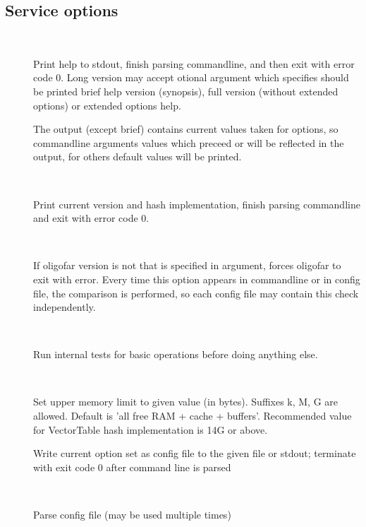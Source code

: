 \documentclass[english]{article}
\begin{document}
\subsection{Service options}
\begin{description}
\item[~~] 
				Print help to stdout, finish parsing commandline, and then 
                exit with error code 0. Long version may accept otional 
                argument which specifies should be printed brief help version
                (synopsis), full version (without extended options) or extended
                options help.

                The output (except brief) contains current values taken for options, 
                so commandline arguments values which preceed  or  will
                be reflected in the output, for others default values will be
                printed.

\item[~~]
				Print current version and hash implementation, finish parsing
                commandline and exit with error code 0.

\item[~~]
				If oligofar version is not that is specified in argument,
                forces oligofar to exit with error.  Every time this option 
                appears in commandline or in config file, the comparison is
                performed, so each config file may contain this check
                independently.  

\item[~~]
				Run internal tests for basic operations before doing anything
                else.
\item[~~]
				Set upper memory limit to given value (in bytes). Suffixes k,
                M, G are allowed. Default is 'all free RAM + cache + buffers'.
                Recommended value for VectorTable hash implementation is 14G or
                above.
\item[]
				Write current option set as config file to the given file or stdout; 
				terminate with exit code 0 after command line is parsed
\item[~~]
				Parse config file (may be used multiple times)
\end{description}
\end{document}
